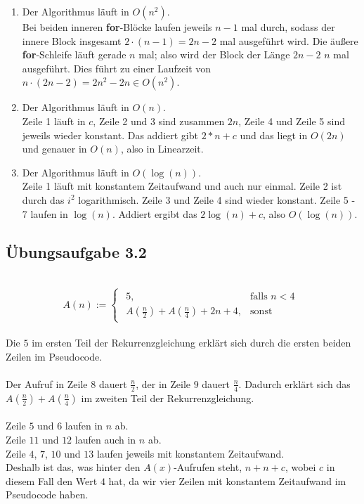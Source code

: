 \documentclass{article}
\begin{document}
\begin{enumerate}
	\item Der Algorithmus läuft in $O(n^2)$.\\
	Bei beiden inneren \textbf{for}-Blöcke laufen jeweils $n-1$ mal durch, sodass der innere Block insgesamt $2 \cdot (n-1)=2n-2$ mal ausgeführt wird.
	Die äußere \textbf{for}-Schleife läuft gerade $n$ mal; also wird der Block der Länge $2n-2$ $n$ mal ausgeführt.
	Dies führt zu einer Laufzeit von $n \cdot (2n-2)=2n^2-2n \in O(n^2)$.
	\item Der Algorithmus läuft in $O(n)$.\\
	Zeile 1 läuft in $c$, Zeile 2 und 3 sind zusammen $2n$, Zeile 4 und Zeile 5 sind jeweils wieder konstant. Das addiert gibt $2*n + c$ und das liegt in $O(2n)$ und genauer in $O(n)$, also in Linearzeit.
	\item Der Algorithmus läuft in $O(\operatorname{log}(n))$.\\
	Zeile 1 läuft mit konstantem Zeitaufwand und auch nur einmal. Zeile 2 ist durch das $i^2$ logarithmisch. Zeile 3 und Zeile 4 sind wieder konstant. Zeile 5 - 7 laufen in $\operatorname{log}(n)$. Addiert ergibt das $2\operatorname{log}(n)+c$, also $O(\operatorname{log}(n))$.
\end{enumerate}
\subsection{Übungsaufgabe 3.2}
\begin{flushright}
\begin{Large}
[~~~~\string| ~~2~]
\end{Large}
\end{flushright}
\vspace{1cm}\-\\

\[
    A(n) :=  \begin{cases}
		\begin{array}{ll}
	    	5, & \text{falls }n<4\\
			A(\frac{n}{2})+A(\frac{n}{4})+2n+4, &\text{sonst}
		\end{array}
	\end{cases}
\]
\\
Die $5$ im ersten Teil der Rekurrenzgleichung erklärt sich durch die ersten beiden Zeilen im Pseudocode.\\\\
Der Aufruf in Zeile $8$ dauert $\frac{n}{2}$, der in Zeile $9$ dauert $\frac{n}{4}$. Dadurch erklärt sich das $A(\frac{n}{2})+A(\frac{n}{4})$ im zweiten Teil der Rekurrenzgleichung.\\\\
Zeile $5$ und $6$ laufen in $n$ ab.\\
Zeile $11$ und $12$ laufen auch in $n$ ab.\\
Zeile $4$, $7$, $10$ und $13$ laufen jeweils mit konstantem Zeitaufwand.\\
Deshalb ist das, was hinter den $A(x)$-Aufrufen steht, $n+n+c$, wobei $c$ in diesem Fall den Wert $4$ hat, da wir vier Zeilen mit konstantem Zeitaufwand im Pseudocode haben.
\end{document}
